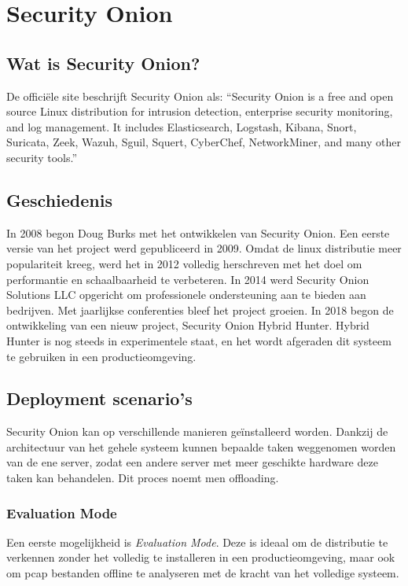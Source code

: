 \documentclass[a4paper,12pt]{report}
\begin{document}
\chapter{Security Onion}
\section{Wat is Security Onion?}
De officiële site beschrijft Security Onion als:
``Security Onion is a free and open source Linux distribution for intrusion detection, enterprise security monitoring, and log management.
It includes Elasticsearch, Logstash, Kibana, Snort, Suricata, Zeek, Wazuh, Sguil, Squert, CyberChef, NetworkMiner, and many other security tools.''
\autocite{so:docs}

\section{Geschiedenis}
In 2008 begon Doug Burks met het ontwikkelen van Security Onion.
Een eerste versie van het project werd gepubliceerd in 2009.
Omdat de linux distributie meer populariteit kreeg, werd het in 2012 volledig herschreven met het doel om performantie en schaalbaarheid te verbeteren.
In 2014 werd Security Onion Solutions LLC opgericht om professionele ondersteuning aan te bieden aan bedrijven.
Met jaarlijkse conferenties bleef het project groeien.
\autocite{so:sos}
In 2018 begon de ontwikkeling van een nieuw project, Security Onion Hybrid Hunter.
Hybrid Hunter is nog steeds in experimentele staat, en het wordt afgeraden dit systeem te gebruiken in een productieomgeving.

\section{Deployment scenario's}
Security Onion kan op verschillende manieren geïnstalleerd worden.
Dankzij de architectuur van het gehele systeem kunnen bepaalde taken weggenomen worden van de ene server, zodat een andere server met meer geschikte hardware deze taken kan behandelen.
Dit proces noemt men offloading.

\subsection{Evaluation Mode}
Een eerste mogelijkheid is \emph{Evaluation Mode}.
Deze is ideaal om de distributie te verkennen zonder het volledig te installeren in een productieomgeving, maar ook om pcap bestanden offline te analyseren met de kracht van het volledige systeem.
\end{document}
